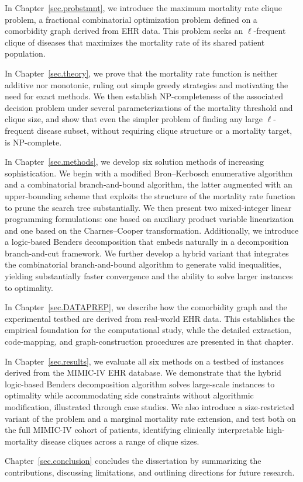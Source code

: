 In Chapter~\ref{sec.probstmnt}, we introduce the maximum mortality
rate clique problem, a fractional combinatorial optimization
problem defined on a comorbidity graph derived from EHR data. This problem seeks an $\ell$-frequent clique of diseases that maximizes the mortality rate of its shared patient population.

In Chapter~\ref{sec.theory}, we prove that the mortality rate function
is neither additive nor monotonic, ruling out simple greedy strategies
and motivating the need for exact methods. We then establish
NP-completeness of the associated decision problem under several
parameterizations of the mortality threshold and clique size, and show
that even the simpler problem of finding any large $\ell$-frequent
disease subset, without requiring clique structure or a mortality
target, is NP-complete.

In Chapter~\ref{sec.methods}, we develop six solution methods of
increasing sophistication. We begin with a modified Bron--Kerbosch
enumerative algorithm and a combinatorial branch-and-bound
algorithm, the latter augmented with an upper-bounding scheme
that exploits the structure of the mortality rate function to prune
the search tree substantially. We then present two mixed-integer linear programming formulations:
one based on auxiliary product variable linearization and one based on
the Charnes--Cooper transformation. Additionally, we introduce a logic-based Benders decomposition that embeds naturally in a decomposition
branch-and-cut framework. We further develop a hybrid variant that
integrates the combinatorial branch-and-bound algorithm to generate valid inequalities, yielding substantially faster convergence and the ability to solve larger instances to optimality.

In Chapter~\ref{sec.DATAPREP}, we describe how the comorbidity graph and the experimental testbed are derived from real-world EHR data. This establishes the empirical foundation for the computational study, while the detailed extraction, code-mapping, and graph-construction procedures are presented in that chapter.

In Chapter~\ref{sec.results}, we evaluate all six methods on a testbed of instances derived from the MIMIC-IV EHR database. We demonstrate that the hybrid logic-based Benders decomposition algorithm solves large-scale instances to optimality while accommodating side constraints without algorithmic modification, illustrated through  case studies. We also introduce a size-restricted variant of the problem and a marginal mortality rate extension, and test both on the full MIMIC-IV cohort of  patients, identifying clinically interpretable high-mortality disease cliques across a range of clique sizes.


Chapter~\ref{sec.conclusion} concludes the dissertation by summarizing
the contributions, discussing limitations, and outlining directions
for future research.

